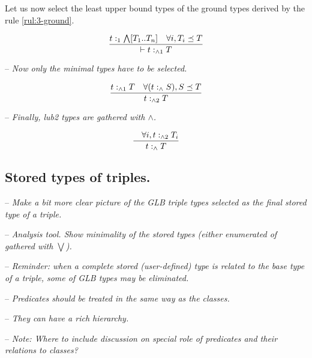 \documentclass[runningheads]{llncs}
\newcommand{\nl}{\hfill\break}
\newcommand{\memo}[1]{}
\newcommand{\notes}[1]{\noindent\begin{small}-- \emph{#1}\\\end{small}}
\begin{document}
Let us now select the least upper bound types of the ground types
derived by the rule \ref{rul:3-ground}.

\begin{equation}
\dfrac{t:_1\bigwedge[T_1..T_n]\quad \forall\/i, T_i\preceq\/T}
      {\vdash\/t:_{\land1}\/T}
\end{equation}


\notes{Now only the minimal types have to be selected.}


\begin{equation}
\dfrac{t:_{\land1}\/T\quad \forall(t:_\land\/S), S\preceq\/T}
      {t:_{\land2}\/T}
\end{equation}


\notes{Finally, lub2 types are gathered with $\land$.}


\begin{equation}
\dfrac{\quad \forall i, t:_{\land2}\/T_i}
      {t:_\land\/T}
\end{equation}


\memo{The types of $s$ and $o$ can be any classes $T_s$ and $T_o$ from
  ${\cal I}_c$, while the type of $p$ has to be a class $T_p$ that is
  a subclass of rdf:Property. The typing of a triple $t$ is correct
  since the interpretation of $T$ includes $t$.}

\memo{Moreover, the types $T$ that are derived by the above rule are
  minimal in the sense that given the information provided, i.e., the
  types of $t$'s components, their interpretations are minimal
  possible comparing them to the interpretations of all other derived
  types of $t$.}






\subsection{Stored types of triples.}\nl

\notes{Make a bit more clear picture of the GLB triple types selected as the final stored type of a triple.}
\notes{Analysis tool. Show minimality of the stored types (either enumerated of gathered with $\bigvee$).}
\notes{\emph{Reminder:} when a complete stored (user-defined) type is related to the base type of a triple, some of GLB types may be eliminated.}

\notes{Predicates should be treated in the same way as the classes.}
\notes{They can have a rich hierarchy.}
\notes{\emph{Note:} Where to include discussion on special role of predicates and their relations to classes?}
\end{document}
